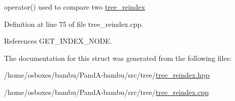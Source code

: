 operator() used to compare two \hyperlink{classtree__reindex}{tree\+\_\+reindex} 



Definition at line 75 of file tree\+\_\+reindex.\+cpp.



References G\+E\+T\+\_\+\+I\+N\+D\+E\+X\+\_\+\+N\+O\+DE.



The documentation for this struct was generated from the following files\+:\begin{DoxyCompactItemize}
\item 
/home/osboxes/bambu/\+Pand\+A-\/bambu/src/tree/\hyperlink{tree__reindex_8hpp}{tree\+\_\+reindex.\+hpp}\item 
/home/osboxes/bambu/\+Pand\+A-\/bambu/src/tree/\hyperlink{tree__reindex_8cpp}{tree\+\_\+reindex.\+cpp}\end{DoxyCompactItemize}
